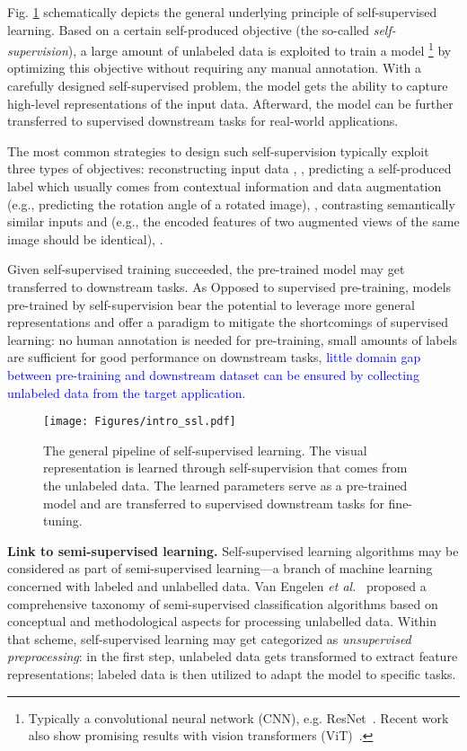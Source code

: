 \documentclass[lettersize,journal]{IEEEtran}
\newcommand{\etal}{\textit{et al.}}
\begin{document}
Fig. \ref{fig:SelfSupervisionScheme} schematically depicts the general underlying principle of self-supervised learning. Based on a certain self-produced objective (the so-called \textit{self-supervision}), a large amount of unlabeled data is exploited to train a model \footnote{Typically a convolutional neural network (CNN), e.g. ResNet~\cite{he2016deep}. Recent work also show promising results with vision transformers (ViT)~\cite{dosovitskiy2020image}.} by optimizing this objective without requiring any manual annotation. With a carefully designed self-supervised problem, the model  gets the ability to capture high-level representations of the input data. Afterward, the model  can be further transferred to supervised downstream tasks for real-world applications.  

The most common strategies to design such self-supervision typically exploit three types of objectives:  reconstructing input data , ,  predicting a self-produced label  which usually comes from contextual information and data augmentation (e.g., predicting the rotation angle of a rotated image), ,  contrasting semantically similar inputs  and  (e.g., the encoded features of two augmented views of the same image should be identical), .

Given self-supervised training succeeded, the pre-trained model  may get transferred to downstream tasks. As Opposed to supervised pre-training, models pre-trained by self-supervision bear the potential to leverage more general representations and offer a paradigm to mitigate the shortcomings of supervised learning:  no human annotation is needed for pre-training,  small amounts of labels are sufficient for good performance on downstream tasks,  \textcolor{blue}{little domain gap between pre-training and downstream dataset can be ensured by collecting unlabeled data from the target application.}


\begin{figure}
    \centering
    \texttt{[image: Figures/intro\_ssl.pdf]}
    \caption{The general pipeline of self-supervised learning. The visual representation is learned through self-supervision that comes from the unlabeled data. The learned parameters serve as a pre-trained model and are transferred to supervised downstream tasks for fine-tuning.}
    \label{fig:SelfSupervisionScheme}
\end{figure}


\textbf{Link to semi-supervised learning.} Self-supervised learning algorithms may be considered as part of semi-supervised learning---a branch of machine learning concerned with labeled and unlabelled data. Van Engelen \etal~\cite{van2020survey} proposed a comprehensive taxonomy of semi-supervised classification algorithms based on conceptual and methodological aspects for processing unlabelled data. Within that scheme, self-supervised learning may get categorized as \textit{unsupervised preprocessing}: in the first step, unlabeled data gets transformed to extract feature representations; labeled data is then utilized to adapt the model to specific tasks.
\end{document}
